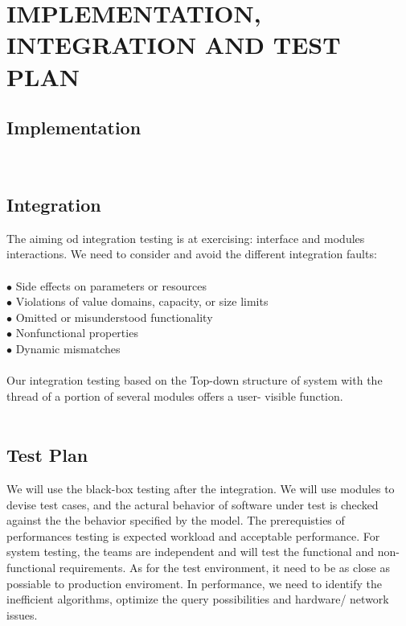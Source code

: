 \documentclass[a4paper,12pt]{report}
\begin{document}
\chapter{IMPLEMENTATION, INTEGRATION AND TEST PLAN}\label{ch:implementation-integration-and-test-plan}


\section{Implementation }

~\\
\section{Integration}
The aiming od integration testing is at exercising: interface and modules interactions. We need to consider and avoid the different integration faults:~\\
~\\
$\bullet$ Side effects on parameters or resources~\\
$\bullet$ Violations of value domains, capacity, or size limits~\\
$\bullet$ Omitted or misunderstood functionality~\\
$\bullet$ Nonfunctional properties~\\
$\bullet$ Dynamic mismatches\cite{SlidesSE2}~\\
~\\
Our integration testing based on the Top-down structure of system with the thread of a portion of several modules offers a user- visible function.~\\
~\\
\section{Test Plan}
We will use the black-box testing after the integration. We will use modules to devise test cases, and the actural behavior of software under test is checked against the the behavior specified by the model. The prerequisties of performances testing is expected workload and acceptable performance. For system testing, the teams are independent and will test the functional and non-functional requirements. As for the test environment, it need to be as close as possiable to production enviroment. In performance, we need to identify the inefficient algorithms, optimize the query possibilities and hardware/ network issues.
\end{document}
